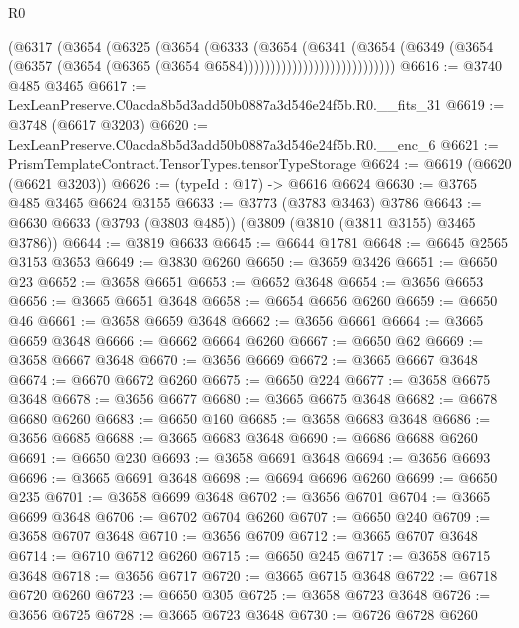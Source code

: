 \begin{lexlean}{R0}
\begin{coremodule}
                                (@6317
                                  (@3654
                                    (@6325
                                      (@3654
                                        (@6333
                                          (@3654
                                            (@6341
                                              (@3654
                                                (@6349
                                                  (@3654
                                                    (@6357
                                                      (@3654
                                                        (@6365
                                                          (@3654 @6584))))))))))))))))))))))))))))
@6616 := @3740 @485 @3465
@6617 := LexLeanPreserve.C0acda8b5d3add50b0887a3d546e24f5b.R0.__fits_31
@6619 := @3748 (@6617 @3203)
@6620 := LexLeanPreserve.C0acda8b5d3add50b0887a3d546e24f5b.R0.__enc_6
@6621 := PrismTemplateContract.TensorTypes.tensorTypeStorage
@6624 := @6619 (@6620 (@6621 @3203))
@6626 := (typeId : @17) -> @6616 @6624
@6630 := @3765 @485 @3465 @6624 @3155
@6633 := @3773 (@3783 @3463) @3786
@6643 := @6630 @6633 (@3793 (@3803 @485)) (@3809 (@3810 (@3811 @3155) @3465 @3786))
@6644 := @3819 @6633
@6645 := @6644 @1781
@6648 := @6645 @2565 @3153 @3653
@6649 := @3830 @6260
@6650 := @3659 @3426
@6651 := @6650 @23
@6652 := @3658 @6651
@6653 := @6652 @3648
@6654 := @3656 @6653
@6656 := @3665 @6651 @3648
@6658 := @6654 @6656 @6260
@6659 := @6650 @46
@6661 := @3658 @6659 @3648
@6662 := @3656 @6661
@6664 := @3665 @6659 @3648
@6666 := @6662 @6664 @6260
@6667 := @6650 @62
@6669 := @3658 @6667 @3648
@6670 := @3656 @6669
@6672 := @3665 @6667 @3648
@6674 := @6670 @6672 @6260
@6675 := @6650 @224
@6677 := @3658 @6675 @3648
@6678 := @3656 @6677
@6680 := @3665 @6675 @3648
@6682 := @6678 @6680 @6260
@6683 := @6650 @160
@6685 := @3658 @6683 @3648
@6686 := @3656 @6685
@6688 := @3665 @6683 @3648
@6690 := @6686 @6688 @6260
@6691 := @6650 @230
@6693 := @3658 @6691 @3648
@6694 := @3656 @6693
@6696 := @3665 @6691 @3648
@6698 := @6694 @6696 @6260
@6699 := @6650 @235
@6701 := @3658 @6699 @3648
@6702 := @3656 @6701
@6704 := @3665 @6699 @3648
@6706 := @6702 @6704 @6260
@6707 := @6650 @240
@6709 := @3658 @6707 @3648
@6710 := @3656 @6709
@6712 := @3665 @6707 @3648
@6714 := @6710 @6712 @6260
@6715 := @6650 @245
@6717 := @3658 @6715 @3648
@6718 := @3656 @6717
@6720 := @3665 @6715 @3648
@6722 := @6718 @6720 @6260
@6723 := @6650 @305
@6725 := @3658 @6723 @3648
@6726 := @3656 @6725
@6728 := @3665 @6723 @3648
@6730 := @6726 @6728 @6260

\end{coremodule}
\end{lexlean}
